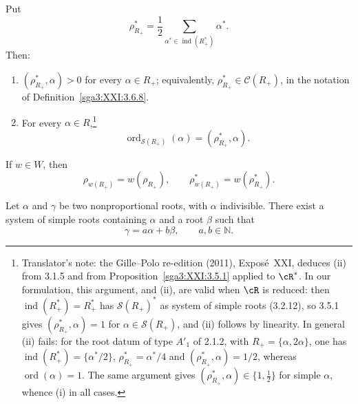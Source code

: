 \begin{corollary}\label{sga3:XXI:3.5.2}
Put
\[
 \rho_{R_+}^\ast
   =\frac12
     \sum_{\alpha^\ast\in\operatorname{ind}(R_+^\ast)}
     \alpha^\ast.
\]
Then:
\begin{enumerate}
\item[(i)] \((\rho_{R_+}^\ast,\alpha)>0\) for every
  \(\alpha\in R_+\); equivalently,
  \(\rho_{R_+}^\ast\in\mathcal{C}(R_+)\), in the notation of
  Definition~\ref{sga3:XXI:3.6.8}.
\item[(ii)] For every \(\alpha\in R\),\footnote{Translator's note: the Gille--Polo re-edition (2011), Exposé~XXI, deduces (ii) from
3.1.5 and from Proposition~\ref{sga3:XXI:3.5.1} applied to \(\cR^\ast\). In our
formulation, this argument, and (ii), are valid when \(\cR\) is reduced: then
\(\operatorname{ind}(R_+^\ast)=R_+^\ast\) has \(\mathscr{S}(R_+)^\ast\) as system of
simple roots (3.2.12), so 3.5.1 gives \((\rho_{R_+}^\ast,\alpha)=1\) for
\(\alpha\in\mathscr{S}(R_+)\), and (ii) follows by linearity. In general (ii) fails: for
the root datum of type \(A'_1\) of 2.1.2, with \(R_+=\{\alpha,2\alpha\}\), one has
\(\operatorname{ind}(R_+^\ast)=\{\alpha^\ast/2\}\), \(\rho_{R_+}^\ast=\alpha^\ast/4\) and
\((\rho_{R_+}^\ast,\alpha)=1/2\), whereas \(\operatorname{ord}(\alpha)=1\). The same
argument gives \((\rho_{R_+}^\ast,\alpha)\in\{1,\frac12\}\) for simple \(\alpha\), whence
(i) in all cases.}
  \[
   \operatorname{ord}_{\mathscr{S}(R_+)}(\alpha)
      =(\rho_{R_+}^\ast,\alpha).
  \]
\end{enumerate}
\end{corollary}

\begin{remark}\label{sga3:XXI:3.5.3}
If \(w\in W\), then
\[
 \rho_{w(R_+)}=w(\rho_{R_+}),
 \qquad
 \rho_{w(R_+)}^\ast=w(\rho_{R_+}^\ast).
\]
\end{remark}

\begin{proposition}\label{sga3:XXI:3.5.4}
Let \(\alpha\) and \(\gamma\) be two nonproportional roots, with
\(\alpha\) indivisible. There exist a system of simple roots
containing \(\alpha\) and a root \(\beta\) such that
\[
 \gamma=a\alpha+b\beta,
 \qquad a,b\in\mathbb{N}.
\]
\end{proposition}

